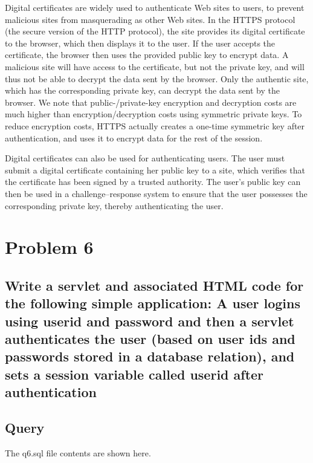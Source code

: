 \documentclass[12pt]{article}
\begin{document}
Digital certificates are widely used to authenticate Web sites to users, to prevent malicious sites from masquerading as other Web sites. In the HTTPS protocol (the secure version of the HTTP protocol), the site provides its digital certificate to the browser, which then displays it to the user. If the user accepts the certificate, the browser then uses the provided public key to encrypt data. A malicious site will have access to the certificate, but not the private key, and will thus not be able to decrypt the data sent by the browser. Only the authentic site, which has the corresponding private key, can decrypt the data sent by the browser. We note that public-/private-key encryption and decryption costs are much higher than encryption/decryption costs using symmetric private keys. To reduce encryption costs, HTTPS actually creates a one-time symmetric key after authentication, and uses it to encrypt data for the rest of the session.

Digital certificates can also be used for authenticating users. The user must submit a digital certificate containing her public key to a site, which verifies that the certificate has been signed by a trusted authority. The user’s public key can then be used in a challenge–response system to ensure that the user possesses the corresponding private key, thereby authenticating the user.

\singlespacing
\newpage

\section{Problem 6}

\subsection*{ Write a servlet and associated HTML code for the following simple application: A user logins using userid and password and then a servlet authenticates the user (based on user ids and passwords stored in a database relation), and sets a session variable called userid after authentication}


\subsection{Query}
The q6.sql file contents are shown here.
\vspace{5mm} \\
\end{document}
